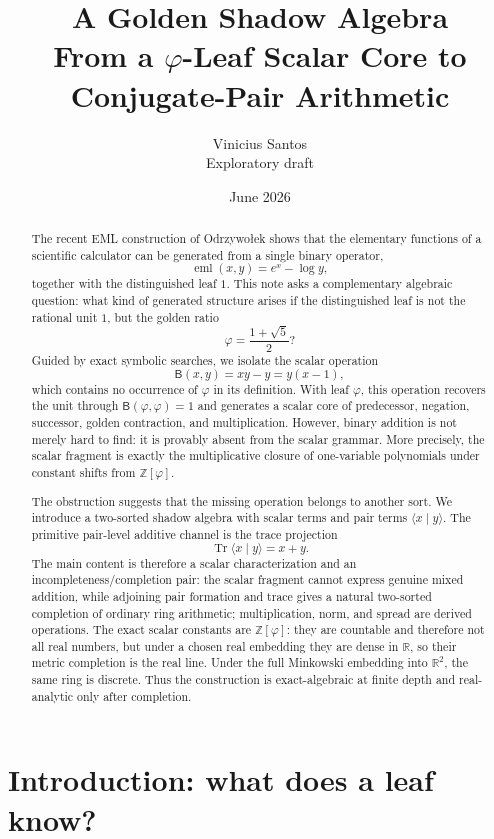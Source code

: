 \documentclass[11pt]{article}
\title{A Golden Shadow Algebra\\
\large From a $\varphi$-Leaf Scalar Core to Conjugate-Pair Arithmetic}
\author{Vinicius Santos\\
\small Exploratory draft}
\date{June 2026}
\newcommand{\B}{\mathsf{B}}
\newcommand{\Tr}{\operatorname{Tr}}
\newcommand{\ph}{\varphi}
\newcommand{\Z}{\mathbb{Z}}
\newcommand{\R}{\mathbb{R}}
\begin{document}
\maketitle

\begin{abstract}
The recent EML construction of Odrzywo\l{}ek shows that the elementary functions of a scientific calculator can be generated from a single binary operator,
\[
\operatorname{eml}(x,y)=e^x-\log y,
\]
together with the distinguished leaf $1$.  This note asks a complementary algebraic question: what kind of generated structure arises if the distinguished leaf is not the rational unit $1$, but the golden ratio
\[
\ph=\frac{1+\sqrt5}{2}?
\]
Guided by exact symbolic searches, we isolate the scalar operation
\[
\B(x,y)=xy-y=y(x-1),
\]
which contains no occurrence of $\ph$ in its definition.  With leaf $\ph$, this operation recovers the unit through $\B(\ph,\ph)=1$ and generates a scalar core of predecessor, negation, successor, golden contraction, and multiplication.  However, binary addition is not merely hard to find: it is provably absent from the scalar grammar.  More precisely, the scalar fragment is exactly the multiplicative closure of one-variable polynomials under constant shifts from $\Z[\ph]$.

The obstruction suggests that the missing operation belongs to another sort.  We introduce a two-sorted shadow algebra with scalar terms and pair terms $\langle x\mid y\rangle$.  The primitive pair-level additive channel is the trace projection
\[
\Tr\langle x\mid y\rangle=x+y.
\]
The main content is therefore a scalar characterization and an incompleteness/completion pair: the scalar fragment cannot express genuine mixed addition, while adjoining pair formation and trace gives a natural two-sorted completion of ordinary ring arithmetic; multiplication, norm, and spread are derived operations.  The exact scalar constants are $\Z[\ph]$: they are countable and therefore not all real numbers, but under a chosen real embedding they are dense in $\R$, so their metric completion is the real line.  Under the full Minkowski embedding into $\R^2$, the same ring is discrete.  Thus the construction is exact-algebraic at finite depth and real-analytic only after completion.
\end{abstract}

\tableofcontents

\section{Introduction: what does a leaf know?}
\end{document}
